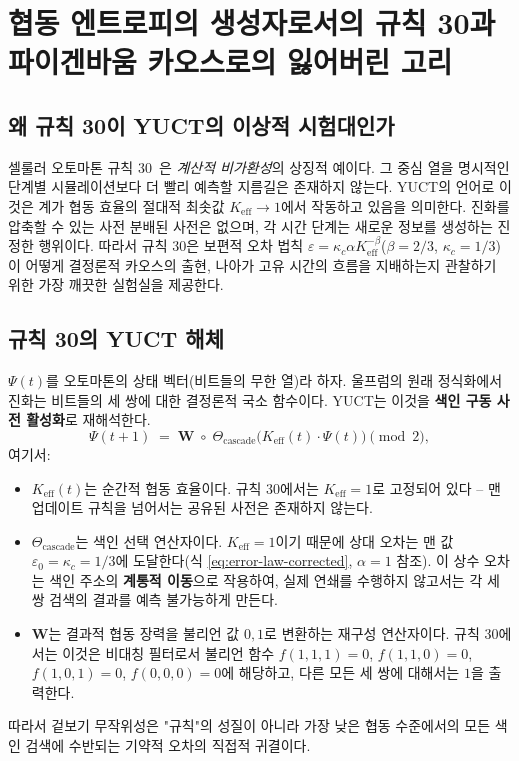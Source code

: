 \documentclass[11pt,a4paper]{article}
\newcommand{\Keff}{K_{\mathrm{eff}}}
\begin{document}
	\section{협동 엔트로피의 생성자로서의 규칙 30과 파이겐바움 카오스로의 잃어버린 고리}
	\label{sec:rule30}
	
	\subsection{왜 규칙 30이 YUCT의 이상적 시험대인가}
	셀룰러 오토마톤 규칙 30~\cite{Wolfram2002}은 \textit{계산적 비가환성}의 상징적 예이다. 그 중심 열을 명시적인 단계별 시뮬레이션보다 더 빨리 예측할 지름길은 존재하지 않는다. YUCT의 언어로 이것은 계가 협동 효율의 절대적 최솟값 \(\Keff \to 1\)에서 작동하고 있음을 의미한다. 진화를 압축할 수 있는 사전 분배된 사전은 없으며, 각 시간 단계는 새로운 정보를 생성하는 진정한 행위이다. 따라서 규칙 30은 보편적 오차 법칙 \(\varepsilon = \kappa_c \alpha \Keff^{-\beta}\)(\(\beta=2/3\), \(\kappa_c=1/3\))이 어떻게 결정론적 카오스의 출현, 나아가 고유 시간의 흐름을 지배하는지 관찰하기 위한 가장 깨끗한 실험실을 제공한다.
	
	\subsection{규칙 30의 YUCT 해체}
	\label{subsec:deconstruction}
	
	\(\Psi(t)\)를 오토마톤의 상태 벡터(비트들의 무한 열)라 하자. 울프럼의 원래 정식화에서 진화는 비트들의 세 쌍에 대한 결정론적 국소 함수이다. YUCT는 이것을 \textbf{색인 구동 사전 활성화}로 재해석한다.
	\begin{equation}
		\Psi(t+1) \;=\; \mathbf{W}\;\circ\;
		\Theta_{\mathrm{cascade}}\!\bigl(\Keff(t)\cdot\Psi(t)\bigr)
		\pmod{2},
		\label{eq:rule30-ypsdc}
	\end{equation}
	여기서:
	\begin{itemize}
		\item \(\Keff(t)\)는 순간적 협동 효율이다. 규칙 30에서는 \(\Keff = 1\)로 고정되어 있다 – 맨 업데이트 규칙을 넘어서는 공유된 사전은 존재하지 않는다.
		\item \(\Theta_{\mathrm{cascade}}\)는 색인 선택 연산자이다. \(\Keff=1\)이기 때문에 상대 오차는 맨 값 \(\varepsilon_0 = \kappa_c = 1/3\)에 도달한다(식 \eqref{eq:error-law-corrected}, \(\alpha=1\) 참조). 이 상수 오차는 색인 주소의 \textbf{계통적 이동}으로 작용하여, 실제 연쇄를 수행하지 않고서는 각 세 쌍 검색의 결과를 예측 불가능하게 만든다.
		\item \(\mathbf{W}\)는 결과적 협동 장력을 불리언 값 \(0,1\)로 변환하는 재구성 연산자이다. 규칙 30에서는 이것은 비대칭 필터로서 불리언 함수 \(f(1,1,1)=0\), \(f(1,1,0)=0\), \(f(1,0,1)=0\), \(f(0,0,0)=0\)에 해당하고, 다른 모든 세 쌍에 대해서는 \(1\)을 출력한다.
	\end{itemize}
	따라서 겉보기 무작위성은 "규칙"의 성질이 아니라 가장 낮은 협동 수준에서의 모든 색인 검색에 수반되는 기약적 오차의 직접적 귀결이다.
	
\end{document}
